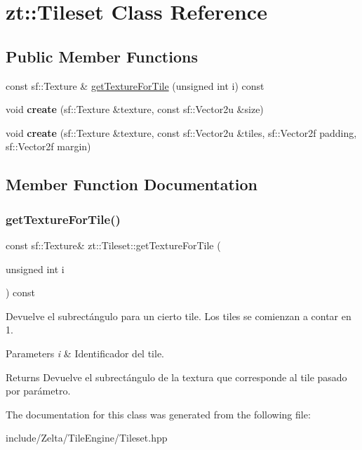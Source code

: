 \hypertarget{classzt_1_1_tileset}{}\section{zt\+:\+:Tileset Class Reference}
\label{classzt_1_1_tileset}
\subsection*{Public Member Functions}
\begin{DoxyCompactItemize}
\item 
const sf\+::\+Texture \& \hyperlink{classzt_1_1_tileset_aedae616d1a77443e22f6e1613946ec1b}{get\+Texture\+For\+Tile} (unsigned int i) const
\item 
\mbox{\label{classzt_1_1_tileset_a6400f74fa3c1d51235715b07c743ed90}} 
void {\bfseries create} (sf\+::\+Texture \&texture, const sf\+::\+Vector2u \&size)
\item 
\mbox{\label{classzt_1_1_tileset_a19192046cbbe4f09d05058ca442a5360}} 
void {\bfseries create} (sf\+::\+Texture \&texture, const sf\+::\+Vector2u \&tiles, sf\+::\+Vector2f padding, sf\+::\+Vector2f margin)
\end{DoxyCompactItemize}


\subsection{Member Function Documentation}
\mbox{\label{classzt_1_1_tileset_aedae616d1a77443e22f6e1613946ec1b}} 
\subsubsection{\texorpdfstring{get\+Texture\+For\+Tile()}{getTextureForTile()}}
{\footnotesize\ttfamily const sf\+::\+Texture\& zt\+::\+Tileset\+::get\+Texture\+For\+Tile (\begin{DoxyParamCaption}\item[{unsigned int}]{i }\end{DoxyParamCaption}) const}

Devuelve el subrectángulo para un cierto tile. Los tiles se comienzan a contar en 1. 
\begin{DoxyParams}{Parameters}
{\em i} & Identificador del tile. \\
\hline
\end{DoxyParams}
\begin{DoxyReturn}{Returns}
Devuelve el subrectángulo de la textura que corresponde al tile pasado por parámetro. 
\end{DoxyReturn}


The documentation for this class was generated from the following file\+:\begin{DoxyCompactItemize}
\item 
include/\+Zelta/\+Tile\+Engine/Tileset.\+hpp\end{DoxyCompactItemize}

